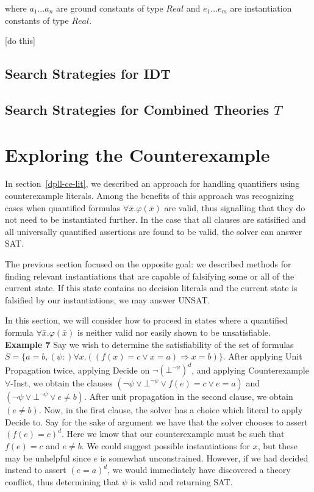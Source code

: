 \documentclass{llncs}
\begin{document}
where $a_1 \ldots a_n$ are ground constants of type $Real$ and $e_1 \ldots e_m$ are instantiation constants of type $Real$.

[do this]

\subsection{Search Strategies for IDT}

\subsection{Search Strategies for Combined Theories $T$}

\section{Exploring the Counterexample}

In section~\ref{dpll-ce-lit}, we described an approach for handling quantifiers using counterexample literals.
Among the benefits of this approach was recognizing cases when quantified formulas $\forall \bar{x}. \varphi( \bar{x} )$ are valid, thus signalling that they do not need to be instantiated further.
In the case that all clauses are satisified and all universally quantified assertions are found to be valid, the solver can answer SAT.

The previous section focused on the opposite goal: we described methods for finding relevant instantiations that are capable of falsifying some or all of the current state.
If this state contains no decision literals and the current state is falsified by our instantiations, we may answer UNSAT.

In this section, we will consider how to proceed in states where a quantified formula $\forall \bar{x}. \varphi( \bar{x} )$ is neither valid nor easily shown to be unsatisfiable. \\

{\bf Example 7} 
Say we wish to determine the satisfiability of the set of formulas $S = \{ a = b, (\psi :) \forall x. ((f(x) = c \vee x = a) \Rightarrow x = b) \}$.
After applying Unit Propagation twice, applying Decide on $\neg (\bot^{ \neg \psi })^d$, and applying Counterexample $\forall$-Inst, we obtain the clauses $( \neg \psi \vee \bot^{ \neg \psi } \vee f(e) = c \vee e = a )$ and $( \neg \psi \vee \bot^{ \neg \psi } \vee e \neq b )$.
After unit propagation in the second clause, we obtain $( e \neq b )$.
Now, in the first clause, the solver has a choice which literal to apply Decide to.
Say for the sake of argument we have that the solver chooses to assert $( f(e) = c )^d$.
Here we know that our counterexample must be such that $f( e ) = c$ and $e \neq b$.
We could suggest possible instantiations for $x$, but these may be unhelpful since $e$ is somewhat unconstrained.
However, if we had decided instead to assert $( e = a )^d$, we would immediately have discovered a theory conflict, thus determining that $\psi$ is valid and returning SAT. \\
\end{document}
